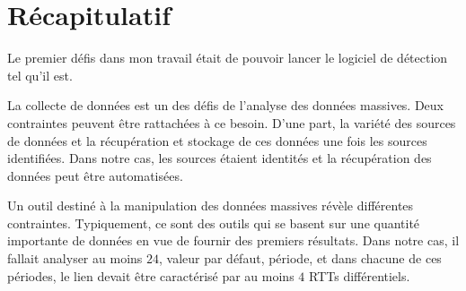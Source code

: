 \section{Récapitulatif}

Le premier défis dans mon travail était de pouvoir lancer le logiciel de détection tel qu'il est. 
%

La collecte de données est un des défis de l'analyse des données massives. Deux contraintes peuvent être rattachées à ce besoin. D'une part, la variété des sources de données et la récupération et stockage de ces données une fois les sources identifiées. Dans notre cas, les sources étaient identités et la récupération des données peut être automatisées.   

Un outil destiné à la manipulation des données massives révèle différentes contraintes.  Typiquement, ce sont des outils qui se basent sur une quantité importante de données en vue de fournir des premiers résultats. Dans notre cas, il fallait analyser au moins $24$, valeur par défaut, période, et dans chacune de ces périodes, le lien devait être caractérisé par au moins  $4$ RTTs différentiels. 









